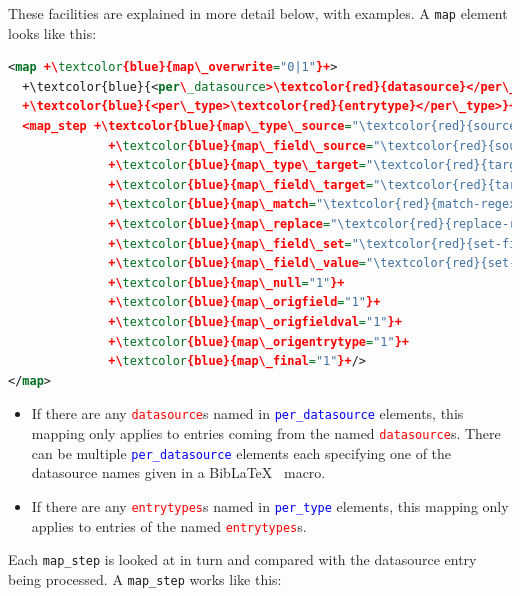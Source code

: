 \documentclass{ltxdockit}
\begin{document}
\noindent These facilities are explained in more detail below, with
examples. A \verb+map+ element looks like this:

\begin{lstlisting}[language=xml,escapechar=+,mathescape=true]
<map +\textcolor{blue}{map\_overwrite="0|1"}+>
  +\textcolor{blue}{<per\_datasource>\textcolor{red}{datasource}</per\_datasource>}+
  +\textcolor{blue}{<per\_type>\textcolor{red}{entrytype}</per\_type>}+
  <map_step +\textcolor{blue}{map\_type\_source="\textcolor{red}{source-entrytype}"}+
              +\textcolor{blue}{map\_field\_source="\textcolor{red}{source-field}"}+
              +\textcolor{blue}{map\_type\_target="\textcolor{red}{target-entrytype}"}+
              +\textcolor{blue}{map\_field\_target="\textcolor{red}{target-field}"}+
              +\textcolor{blue}{map\_match="\textcolor{red}{match-regexp}"}+
              +\textcolor{blue}{map\_replace="\textcolor{red}{replace-regexp}"}+
              +\textcolor{blue}{map\_field\_set="\textcolor{red}{set-field}"}+
              +\textcolor{blue}{map\_field\_value="\textcolor{red}{set-value}"}+
              +\textcolor{blue}{map\_null="1"}+
              +\textcolor{blue}{map\_origfield="1"}+
              +\textcolor{blue}{map\_origfieldval="1"}+
              +\textcolor{blue}{map\_origentrytype="1"}+
              +\textcolor{blue}{map\_final="1"}+/>
</map>
\end{lstlisting}

\begin{itemize}
\item If there are any \textcolor{red}{\texttt{datasource}}s named in
  \textcolor{blue}{\texttt{per\_datasource}} elements, this mapping only applies to entries
  coming from the named \textcolor{red}{\texttt{datasource}}s. There can be
  multiple \textcolor{blue}{\texttt{per\_datasource}} elements each specifying one of the
  datasource names given in a Bib\LaTeX\ \verb++ macro.
\item If there are any \textcolor{red}{\texttt{entrytypes}}s named in
  \textcolor{blue}{\texttt{per\_type}} elements, this mapping only applies to entries
  of the named \textcolor{red}{\texttt{entrytypes}}s.
\end{itemize}

\noindent Each \verb+map_step+ is looked at in turn and compared with the
datasource entry being processed. A \verb+map_step+ works like this:
\end{document}
